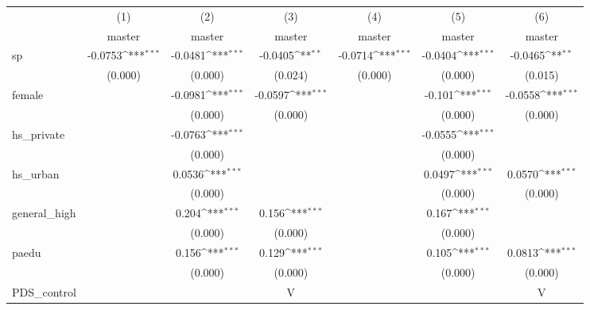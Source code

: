 \documentclass[11pt, letterpaper]{article}
\begin{document}
{
\def\sym#1{\ifmmode^{#1}\else\(^{#1}\)\fi}
\begin{tabular}{l*{6}{c}}
\hline\hline
            &\multicolumn{1}{c}{(1)}&\multicolumn{1}{c}{(2)}&\multicolumn{1}{c}{(3)}&\multicolumn{1}{c}{(4)}&\multicolumn{1}{c}{(5)}&\multicolumn{1}{c}{(6)}\\
            &\multicolumn{1}{c}{master}&\multicolumn{1}{c}{master}&\multicolumn{1}{c}{master}&\multicolumn{1}{c}{master}&\multicolumn{1}{c}{master}&\multicolumn{1}{c}{master}\\
\hline
sp          &     -0.0753\sym{***}&     -0.0481\sym{***}&     -0.0405\sym{**} &     -0.0714\sym{***}&     -0.0404\sym{***}&     -0.0465\sym{**} \\
            &     (0.000)         &     (0.000)         &     (0.024)         &     (0.000)         &     (0.000)         &     (0.015)         \\
[1em]
female      &                     &     -0.0981\sym{***}&     -0.0597\sym{***}&                     &      -0.101\sym{***}&     -0.0558\sym{***}\\
            &                     &     (0.000)         &     (0.000)         &                     &     (0.000)         &     (0.000)         \\
[1em]
hs\_private  &                     &     -0.0763\sym{***}&                     &                     &     -0.0555\sym{***}&                     \\
            &                     &     (0.000)         &                     &                     &     (0.000)         &                     \\
[1em]
hs\_urban    &                     &      0.0536\sym{***}&                     &                     &      0.0497\sym{***}&      0.0570\sym{***}\\
            &                     &     (0.000)         &                     &                     &     (0.000)         &     (0.000)         \\
[1em]
general\_high&                     &       0.204\sym{***}&       0.156\sym{***}&                     &       0.167\sym{***}&                     \\
            &                     &     (0.000)         &     (0.000)         &                     &     (0.000)         &                     \\
[1em]
paedu       &                     &       0.156\sym{***}&       0.129\sym{***}&                     &       0.105\sym{***}&      0.0813\sym{***}\\
            &                     &     (0.000)         &     (0.000)         &                     &     (0.000)         &     (0.000)         \\
[1em]
PDS\_control  &                     &                    &      V             &                   &                 &      V \\
            

\end{tabular}}
\end{document}
